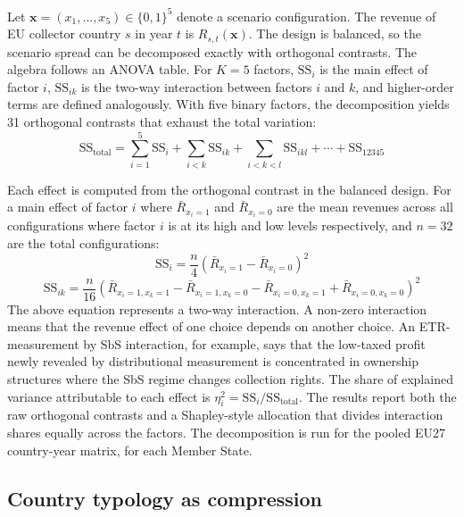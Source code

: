 \documentclass[11pt,a4paper]{article}
\begin{document}
Let $\mathbf{x} = (x_1,\ldots,x_5) \in \{0,1\}^5$ denote a scenario configuration. The revenue of EU collector country $s$ in year $t$ is $R_{s,t}(\mathbf{x})$. The design is balanced, so the scenario spread can be decomposed exactly with orthogonal contrasts. The algebra follows an ANOVA table. For $K=5$ factors, $\text{SS}_i$ is the main effect of factor $i$, $\text{SS}_{ik}$ is the two-way interaction between factors $i$ and $k$, and higher-order terms are defined analogously. With five binary factors, the decomposition yields 31 orthogonal contrasts that exhaust the total variation:
\begin{equation}\label{eq:anova}
\text{SS}_{\text{total}} = \sum_{i=1}^{5} \text{SS}_i + \sum_{i<k} \text{SS}_{ik} + \sum_{i<k<l} \text{SS}_{ikl} + \cdots + \text{SS}_{12345}
\end{equation} 

Each effect is computed from the orthogonal contrast in the balanced design. For a main effect of factor $i$ where $\bar{R}_{x_i = 1}$ and $\bar{R}_{x_i = 0}$ are the mean revenues across all configurations where factor $i$ is at its high and low levels respectively, and $n = 32$ are the total configurations:
\begin{equation}\label{eq:main_effect}
\text{SS}_i = \frac{n}{4} \left(\bar{R}_{x_i = 1} - \bar{R}_{x_i = 0}\right)^2
\end{equation}
\begin{equation}\label{eq:interaction_effect}
\text{SS}_{ik} = \frac{n}{16} \left(\bar{R}_{x_i = 1, x_k = 1} - \bar{R}_{x_i = 1, x_k = 0} - \bar{R}_{x_i = 0, x_k = 1} + \bar{R}_{x_i = 0, x_k = 0}\right)^2
\end{equation}
The above equation represents a two-way interaction. A non-zero interaction means that the revenue effect of one choice depends on another choice. An ETR-measurement by SbS interaction, for example, says that the low-taxed profit newly revealed by distributional measurement is concentrated in ownership structures where the SbS regime changes collection rights. The share of explained variance attributable to each effect is $\eta_i^2=\text{SS}_i/\text{SS}_{\text{total}}$. The results report both the raw orthogonal contrasts and a Shapley-style allocation that divides interaction shares equally across the factors. The decomposition is run for the pooled EU27 country-year matrix, for each Member State.

\subsection{Country typology as compression}\label{sec:country_typology_method}
\end{document}
